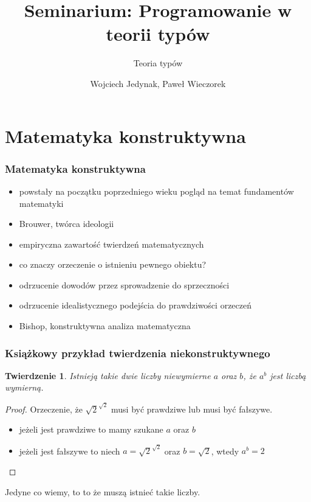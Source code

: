 \documentclass{beamer}
\title{Seminarium: Programowanie w teorii typów}
\subtitle{Teoria typów}
\author{Wojciech Jedynak, Paweł Wieczorek}
\institute{Instytut Informatyki Uniwersytetu Wrocławskiego}
\newtheorem{thm}{Twierdzenie}
\begin{document}

\maketitle



\section{Matematyka konstruktywna}

\begin{frame}
\frametitle{Matematyka konstruktywna}

\begin{itemize}
 \item powstały na początku poprzedniego wieku pogląd na temat fundamentów matematyki
 \item Brouwer, twórca ideologii
 \item empiryczna zawartość twierdzeń matematycznych
 \item co znaczy orzeczenie o istnieniu pewnego obiektu?
 \item odrzucenie dowodów przez sprowadzenie do sprzeczności
 \item odrzucenie idealistycznego podejścia do prawdziwości orzeczeń
 \item Bishop, konstruktywna analiza matematyczna
\end{itemize}


\end{frame}


\begin{frame}
\frametitle{Książkowy przykład twierdzenia niekonstruktywnego}

\begin{thm}
 Istnieją takie dwie liczby niewymierne $a$ oraz $b$, że $a^b$ jest liczbą wymierną.
\end{thm}

\begin{proof}
 Orzeczenie, że $\sqrt{2}^{\sqrt{2}}$ musi być prawdziwe lub musi być fałszywe.
\begin{itemize}
 \item jeżeli jest prawdziwe to mamy szukane $a$ oraz $b$
 \item jeżeli jest fałszywe to niech $a = \sqrt{2}^{\sqrt{2}}$ oraz $b = \sqrt{2}$, wtedy $a^b = 2$
\end{itemize}

\end{proof}

Jedyne co wiemy, to to że muszą istnieć takie liczby. 

\end{frame}
\end{document}
